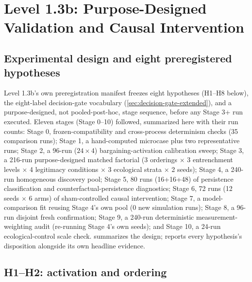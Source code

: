 \section{Level 1.3b: Purpose-Designed Validation and Causal Intervention}
\label{sec:level13b}

\subsection{Experimental design and eight preregistered hypotheses}
\label{sec:level13b-design}

Level 1.3b's own preregistration manifest freezes eight hypotheses (H1--H8
below), the eight-label decision-gate vocabulary
(\cref{sec:decision-gate-extended}), and a purpose-designed, not
pooled-post-hoc, stage sequence, before any Stage 3+ run executed. Eleven
stages (Stage 0--10) followed, summarized here with their run counts:
Stage 0, frozen-compatibility and cross-process determinism checks (35
comparison runs); Stage 1, a hand-computed microcase plus two
representative runs; Stage 2, a 96-run ($24\times4$) bargaining-activation
calibration sweep; Stage 3, a 216-run purpose-designed matched factorial
(3 orderings $\times$ 3 entrenchment levels $\times$ 4 legitimacy
conditions $\times$ 3 ecological strata $\times$ 2 seeds); Stage 4, a
240-run homogeneous discovery pool; Stage 5, 80 runs (16+16+48) of
persistence classification and counterfactual-persistence diagnostics;
Stage 6, 72 runs (12 seeds $\times$ 6 arms) of sham-controlled causal
intervention; Stage 7, a model-comparison fit reusing Stage 4's own pool
(0 new simulation runs); Stage 8, a 96-run disjoint fresh confirmation;
Stage 9, a 240-run deterministic measurement-weighting audit (re-running
Stage 4's own seeds); and Stage 10, a 24-run ecological-control scale
check.  summarizes the design; 
reports every hypothesis's disposition alongside its own headline evidence.

\begin{table}[htbp]
\centering
\caption{Level 1.3b experimental design by stage.}
\label{tab:l13b-design}
\end{table}

\subsection{H1--H2: activation and ordering}
\label{sec:level13b-h1h2}

